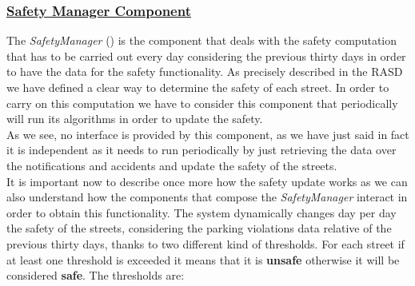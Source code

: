 		\subsubsection[Safety Manager Component]{\hyperlink{toc}{Safety Manager Component}}
			\label{sec:safetyManagerComponent}
			
			The \emph{SafetyManager} () is the component that deals with the safety computation that has to be carried out every day considering the previous thirty days in order to have the data for the safety functionality. As precisely described in the RASD \cite{RASD} we have defined a clear way to determine the safety of each street. In order to carry on this computation we have to consider this component that periodically will run its algorithms in order to update the safety.\\
			
			As we see, no interface is provided by this component, as we have just said in fact it is independent as it needs to run periodically by just retrieving the data over the notifications and accidents and update the safety of the streets.\\
			
			It is important now to describe once more how the safety update works as we can also understand how the components that compose the \emph{SafetyManager} interact in order to obtain this functionality. The system dynamically changes day per day the safety of the streets, considering the parking violations data relative of the previous thirty days, thanks to two different kind of thresholds. For each street if at least one threshold is exceeded it means that it is \textbf{unsafe} otherwise it will be considered \textbf{safe}. The thresholds are:
			
